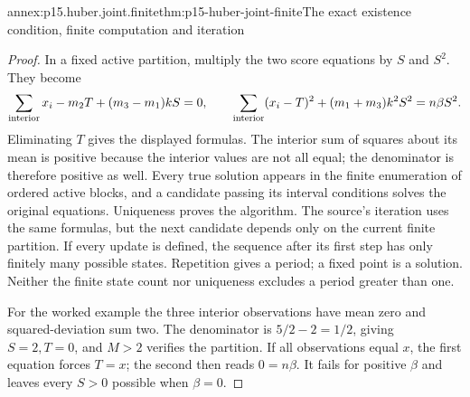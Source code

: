 \begin{annexitem}{annex:p15.huber.joint.finite}{thm:p15-huber-joint-finite}{The exact existence condition, finite computation and iteration}
\begin{proof}
In a fixed active partition, multiply the two score equations by
\(S\) and \(S^2\). They become
\[
 \sum_{\rm interior}x_i-m_2T+(m_3-m_1)kS=0,\qquad
 \sum_{\rm interior}(x_i-T)^2+(m_1+m_3)k^2S^2=n\beta S^2.
\]
Eliminating \(T\) gives the displayed formulas.
The interior sum of squares about its mean is positive because
the interior values are not all equal; the denominator is therefore
positive as well. Every true solution appears in the finite
enumeration of ordered active blocks, and a candidate passing
its interval conditions solves the original equations. Uniqueness
proves the algorithm.
The source's iteration uses the same formulas, but the next
candidate depends only on the current finite partition. If every
update is defined, the sequence after its first step has only
finitely many possible states. Repetition gives a period; a fixed
point is a solution. Neither the finite state count nor uniqueness
excludes a period greater than one.

For the worked example the three interior observations have mean
zero and squared-deviation sum two. The denominator is
\(5/2-2=1/2\), giving \(S=2,T=0\), and \(M>2\) verifies the
partition. If all observations equal \(x\), the first equation
forces \(T=x\); the second then reads \(0=n\beta\).
It fails for positive \(\beta\) and leaves every \(S>0\) possible
when \(\beta=0\).
\end{proof}
\end{annexitem}


